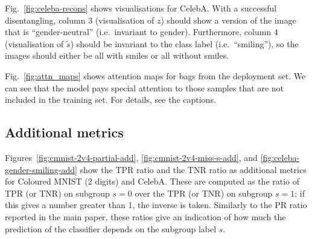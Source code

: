 Fig.~\ref{fig:celeba-recons} shows visualisations for CelebA. 
%
With a successful disentangling, column 3 (visualisation of $z$) should show a version of the image
that is ``gender-neutral'' (i.e.\ invariant to gender). 
%
Furthermore, column 4 (visualisation of $\tilde{s}$) should be invariant to the class label (i.e.\
``smiling''), so the images should either be all with smiles or all without smiles.

Fig.~\ref{fig:attn_maps} shows attention maps for bags from the deployment set. 
%
We can see that the model pays special attention to those samples that are not included in the
training set. For details, see the captions.

\subsection{Additional metrics}\label{sec:additional-metrics}
%
Figures~\ref{fig:cmnist-2v4-partial-add}, \ref{fig:cmnist-2v4-miss-s-add},  and
\ref{fig:celeba-gender-smiling-add} show the \ac{TPR} ratio and the \ac{TNR} ratio as additional
metrics for Coloured MNIST (2 digits) and CelebA. 
%
These are computed as the ratio of \ac{TPR} (or \ac{TNR}) on subgroup $s=0$ over the \ac{TPR} (or
\ac{TNR}) on subgroup $s=1$; if this gives a number greater than 1, the inverse is taken. 
%
Similarly to the PR ratio reported in the main paper, these ratios give an indication of how much
the prediction of the classifier depends on the subgroup label $s$.

